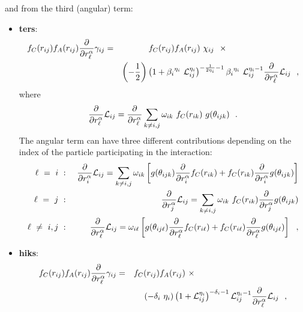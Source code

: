 and from the third (angular) term:
\begin{itemize}
\item {\bf ters}:
\begin{eqnarray}
f_{C}(r_{ij}) f_{A}(r_{ij}) \frac{\partial}{\partial r_{\ell}^{\alpha}} \gamma_{ij}&=&
f_{C}(r_{ij}) f_{A}(r_{ij})~\chi_{ij}~~\times ~~~~~~~~~~~~~~~~~~~~~~~~~~ \nonumber \\
& & \left( -\frac{1}{2} \right) \left( 1 + {\beta_{i}}^{\eta_{i}}~{\cal{L}}_{ij}^{\eta_{i}}
\right)^{-\frac{1}{2 \eta_{i}} - 1} {\beta_{i}}^{\eta_{i}}~{\cal{L}}_{ij}^{\eta_{i}-1}
\frac{\partial}{\partial r_{\ell}^{\alpha}} {\cal{L}}_{ij}~~,
\end{eqnarray}
where
\begin{equation}
\frac{\partial}{\partial r_{\ell}^{\alpha}} {\cal{L}}_{ij} =
\frac{\partial}{\partial r_{\ell}^{\alpha}} \sum_{k \neq i,j}
\omega_{ik}~f_{C}(r_{ik})~g(\theta_{ijk})~~.  \nonumber
\end{equation}
The angular term can have three different contributions depending
on the index of the particle participating in the interaction:
\begin{eqnarray}
\ell~=~i~&:&~\frac{\partial}{\partial r_{i}^{\alpha}} {\cal{L}}_{ij} = \sum_{k \neq i,j} \omega_{ik}
\left[ g(\theta_{ijk}) \frac{\partial}{\partial r_{i}^{\alpha}} f_{C}(r_{ik}) +
f_{C}(r_{ik}) \frac{\partial}{\partial r_{i}^{\alpha}} g(\theta_{ijk}) \right] \nonumber \\
\ell~=~j~&:&~\frac{\partial}{\partial r_{j}^{\alpha}} {\cal{L}}_{ij} = \sum_{k \neq i,j} \omega_{ik}
~f_{C}(r_{ik}) \frac{\partial}{\partial r_{j}^{\alpha}} g(\theta_{ijk}) \\
\ell~\neq~i,j~&:&~\frac{\partial}{\partial r_{\ell}^{\alpha}} {\cal{L}}_{ij} = \omega_{i \ell}
\left[ g(\theta_{ij \ell}) \frac{\partial}{\partial r_{\ell}^{\alpha}} f_{C}(r_{i \ell}) +
f_{C}(r_{i \ell}) \frac{\partial}{\partial r_{\ell}^{\alpha}} g(\theta_{ij \ell}) \right]~~, \nonumber
\end{eqnarray}
\item {\bf hiks}:
\begin{eqnarray}
f_{C}(r_{ij}) f_{A}(r_{ij}) \frac{\partial}{\partial r_{\ell}^{\alpha}} \gamma_{ij}&=&
f_{C}(r_{ij}) f_{A}(r_{ij})~\times ~~~~~~~~~~~~~~~~~~~~~~~~~~~~~~~~~ \nonumber \\
& & \left(-\delta_{i}~\eta_{i}\right) \left( 1 + {\cal{L}}_{ij}^{\eta_{i}}\right)^{-\delta_{i} - 1}
{\cal{L}}_{ij}^{\eta_{i}-1} \frac{\partial}{\partial r_{\ell}^{\alpha}} {\cal{L}}_{ij}~~,
\end{eqnarray}

\end{itemize}
